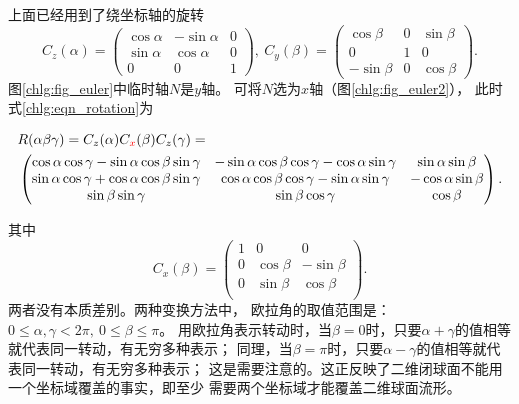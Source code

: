 上面已经用到了绕坐标轴的旋转
\begin{equation}\label{chlg:eqn_rotation-zy}
    {C_z}( \alpha  ) =  \begin{pmatrix}
        {\cos \alpha }&{ - \sin \alpha }&0 \\
        {\sin \alpha }&{\cos \alpha }&0 \\
        0&0&1
    \end{pmatrix} ,\
    {C_y}( \beta ) = \begin{pmatrix}
        {\cos \beta }&0&{  \sin \beta }  \\
        0&1&0\\
        { - \sin \beta } &0&{\cos \beta }
    \end{pmatrix}  .
\end{equation}
图\ref{chlg:fig_euler}中临时轴$N$是$y$轴。
可将$N$选为$x$轴（图\ref{chlg:fig_euler2}），
此时式\eqref{chlg:eqn_rotation}为
\begin{small}

\begin{equation}\label{chlg:eqn_rotation_euler_x}
    \begin{aligned}
        &R(\alpha\beta\gamma)=C_z(\alpha)C_{\color{red}{x}}(\beta)C_z(\gamma) =   \\
        &\begin{pmatrix}
            \cos\alpha \cos\gamma-\sin\alpha \cos\beta \sin\gamma  & -\sin\alpha \cos\beta \cos\gamma -\cos\alpha \sin\gamma &  \sin\alpha \sin\beta \\
            \sin\alpha \cos\gamma+\cos\alpha \cos\beta \sin\gamma  &  \cos\alpha \cos\beta \cos\gamma -\sin\alpha \sin\gamma & -\cos\alpha \sin\beta \\
            \sin\beta  \sin\gamma & \sin\beta \cos\gamma  & \cos\beta
        \end{pmatrix} .
    \end{aligned}
\end{equation}
\end{small}
其中
\begin{equation}\label{chlg:eqn_rotation-x}
    {C_x}( \beta  ) = \begin{pmatrix}
        1&0&0 \\
        0&{\cos \beta }&{ - \sin \beta } \\
        0&{\sin \beta }&{\cos \beta } \\
    \end{pmatrix} .
\end{equation}
两者没有本质差别。两种变换方法中，
欧拉角的取值范围是：$0 \leqslant \alpha, \gamma < 2\pi,\ 0\leqslant \beta \leqslant \pi$。
用欧拉角表示转动时，当$\beta=0$时，只要$\alpha+\gamma$的值相等就代表同一转动，有无穷多种表示；
同理，当$\beta=\pi$时，只要$\alpha-\gamma$的值相等就代表同一转动，有无穷多种表示；
这是需要注意的。这正反映了二维闭球面不能用一个坐标域覆盖的事实，即至少
需要两个坐标域才能覆盖二维球面流形。



